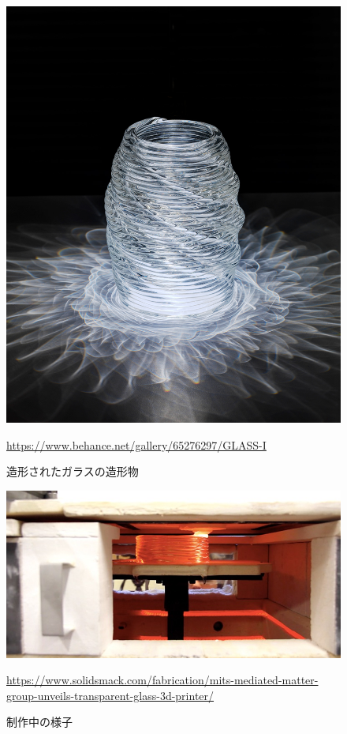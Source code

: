\begin{figure}[H]
  \centering
  \includegraphics[width=8truecm]{./fig/Additive1.jpg}
  \caption{造形されたガラスの造形物}
  \url{https://www.behance.net/gallery/65276297/GLASS-I} %
  \label{fig:ferret}
\end{figure}

\begin{figure}[H]
  \centering
  \includegraphics[width=13truecm]{./fig/Additive3.jpg}
  \caption{制作中の様子}
  \url{https://www.solidsmack.com/fabrication/mits-mediated-matter-group-unveils-transparent-glass-3d-printer/} %
  \label{fig:ferret}
\end{figure}


